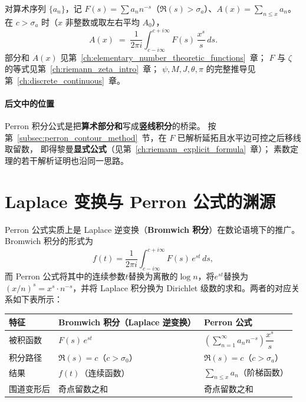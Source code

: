 对算术序列 $\{a_n\}$，记 $F(s)=\sum a_n n^{-s}$（$\Re(s)>\sigma_a$）、$A(x)=\sum_{n\le x}a_n$。
在 $c>\sigma_a$ 时（$x$ 非整数或取左右平均 $A_0$），
\[
  A(x)
  \;=\;
  \frac{1}{2\pi i}
  \int_{c-i\infty}^{c+i\infty} F(s)\,\frac{x^s}{s}\,ds.
\]
部分和 $A(x)$ 见第~\ref{ch:elementary_number_theoretic_functions}~章；
$F$ 与 $\zeta$ 的等式见第~\ref{ch:riemann_zeta_intro}~章；
$\psi,M,J,\theta,\pi$ 的完整推导见第~\ref{ch:discrete_continuous}~章。

\paragraph{后文中的位置}
Perron 积分公式是把\textbf{算术部分和}写成\textbf{竖线积分}的桥梁。
按第~\ref{subsec:perron_contour_method}~节，在 $F$ 已解析延拓且水平边可控之后移线取留数，
即得黎曼\textbf{显式公式}（见第~\ref{ch:riemann_explicit_formula}~章）；
素数定理的若干解析证明也沿同一思路。

\section{Laplace 变换与 Perron 公式的渊源}

Perron 公式实质上是 Laplace 逆变换（\textbf{Bromwich 积分}）在数论语境下的推广。Bromwich 积分的形式为
\[
f(t) = \frac{1}{2\pi i} \int_{c-i\infty}^{c+i\infty} F(s)\, e^{st}\, ds,
\]
而 Perron 公式将其中的连续参数$t$替换为离散的$\log n$，将$e^{st}$替换为$(x/n)^s = x^s \cdot n^{-s}$，并将 Laplace 积分换为 Dirichlet 级数的求和。两者的对应关系如下表所示：

\begin{center}
\renewcommand{\arraystretch}{1.6}
{
\begin{tabular}{|p{3.2cm}|p{4.6cm}|p{4.6cm}|}
\hline
\textbf{特征} & \textbf{Bromwich 积分（Laplace 逆变换）} & \textbf{Perron 公式} \\
\hline
被积函数 & $F(s)\, e^{st}$ & $\displaystyle\left(\sum_{n=1}^{\infty} a_n n^{-s}\right)\dfrac{x^s}{s}$ \\
\hline
积分路径 & $\Re(s)=c$（$c > \sigma_0$） & $\Re(s)=c$（$c > \sigma_a$） \\
\hline
结果 & $f(t)$（连续函数） & $\displaystyle\sum_{n\le x} a_n$（阶梯函数） \\
\hline
围道变形后 & 奇点留数之和 & 奇点留数之和 \\
\hline
\end{tabular}
}%
\end{center}


